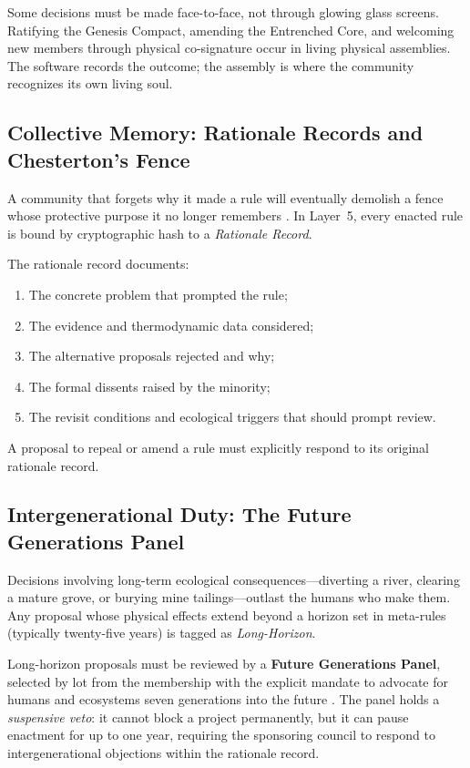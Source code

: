 Some decisions must be made face-to-face, not through glowing glass screens. Ratifying the Genesis Compact, amending the Entrenched Core, and welcoming new members through physical co-signature occur in living physical assemblies. The software records the outcome; the assembly is where the community recognizes its own living soul.

\subsection{Collective Memory: Rationale Records and Chesterton's Fence}
\label{sec:l5-memory}

A community that forgets why it made a rule will eventually demolish a fence whose protective purpose it no longer remembers \parencite{chesterton1929}. In Layer~5, every enacted rule is bound by cryptographic hash to a \textit{Rationale Record}.

The rationale record documents:
\begin{enumerate}
  \item The concrete problem that prompted the rule;
  \item The evidence and thermodynamic data considered;
  \item The alternative proposals rejected and why;
  \item The formal dissents raised by the minority;
  \item The revisit conditions and ecological triggers that should prompt review.
\end{enumerate}
A proposal to repeal or amend a rule must explicitly respond to its original rationale record.

\subsection{Intergenerational Duty: The Future Generations Panel}

Decisions involving long-term ecological consequences—diverting a river, clearing a mature grove, or burying mine tailings—outlast the humans who make them. Any proposal whose physical effects extend beyond a horizon set in meta-rules (typically twenty-five years) is tagged as \textit{Long-Horizon}.

Long-horizon proposals must be reviewed by a \textbf{Future Generations Panel}, selected by lot from the membership with the explicit mandate to advocate for humans and ecosystems seven generations into the future \parencite{wales2015future}. The panel holds a \textit{suspensive veto}: it cannot block a project permanently, but it can pause enactment for up to one year, requiring the sponsoring council to respond to intergenerational objections within the rationale record.

